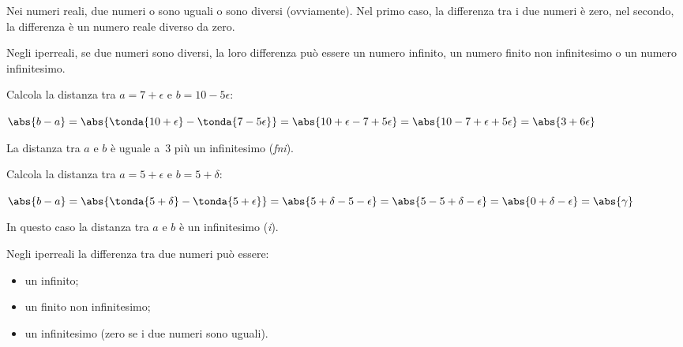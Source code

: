 
Nei numeri reali, due numeri o sono uguali o sono diversi (ovviamente).
Nel primo caso, la differenza tra i due numeri è zero, 
nel secondo, la differenza è un numero reale diverso da zero.

Negli iperreali, se due numeri sono diversi, la loro differenza può 
essere un numero infinito, un numero finito non infinitesimo o un numero 
infinitesimo.

\begin{esempio}
 Calcola la distanza tra \(a=7+\epsilon\) e \(b=10-5\epsilon\):
 
 \(\abs{b-a}=\abs{\tonda{10+\epsilon} - \tonda{7-5\epsilon}}=
   \abs{10+\epsilon - 7+5\epsilon}=
   \abs{10-7 + \epsilon+5\epsilon}=
   \abs{3 + 6\epsilon}
 \)
 
La distanza tra \(a\) e \(b\) è uguale a~3 più un infinitesimo 
(\emph{fni}).
\end{esempio}

\begin{esempio}
 Calcola la distanza tra \(a=5+\epsilon\) e \(b=5+\delta\):
 
 \(\abs{b-a}=\abs{\tonda{5+\delta} - \tonda{5+\epsilon}}=
   \abs{5+\delta - 5-\epsilon}=
   \abs{5-5 + \delta - \epsilon}=
   \abs{0 + \delta - \epsilon} = \abs{\gamma}
 \)
 
 In questo caso la distanza tra \(a\) e \(b\) è un infinitesimo 
(\emph{i}).
\end{esempio}

\noindent Negli iperreali la differenza tra due numeri può essere:

\begin{itemize} [noitemsep]
 \item un infinito;
 \item un finito non infinitesimo;
 \item un infinitesimo (zero se i due numeri sono uguali).
\end{itemize}

% 

